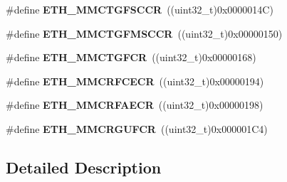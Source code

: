 \begin{DoxyCompactItemize}
\item 
\#define {\bfseries E\+T\+H\+\_\+\+M\+M\+C\+T\+G\+F\+S\+C\+CR}~((uint32\+\_\+t)0x0000014\+C)\hypertarget{group___h_a_l___e_t_h___aliased___defines_ga355a8ef08cc4a431601016a076ae9562}{}\label{group___h_a_l___e_t_h___aliased___defines_ga355a8ef08cc4a431601016a076ae9562}

\item 
\#define {\bfseries E\+T\+H\+\_\+\+M\+M\+C\+T\+G\+F\+M\+S\+C\+CR}~((uint32\+\_\+t)0x00000150)\hypertarget{group___h_a_l___e_t_h___aliased___defines_gad2324378454cb5afc2709afc6849067d}{}\label{group___h_a_l___e_t_h___aliased___defines_gad2324378454cb5afc2709afc6849067d}

\item 
\#define {\bfseries E\+T\+H\+\_\+\+M\+M\+C\+T\+G\+F\+CR}~((uint32\+\_\+t)0x00000168)\hypertarget{group___h_a_l___e_t_h___aliased___defines_ga1de87b7bf29865be1068300dd2946caf}{}\label{group___h_a_l___e_t_h___aliased___defines_ga1de87b7bf29865be1068300dd2946caf}

\item 
\#define {\bfseries E\+T\+H\+\_\+\+M\+M\+C\+R\+F\+C\+E\+CR}~((uint32\+\_\+t)0x00000194)\hypertarget{group___h_a_l___e_t_h___aliased___defines_gacb9b04ab9c5957905a2db7314d6907b8}{}\label{group___h_a_l___e_t_h___aliased___defines_gacb9b04ab9c5957905a2db7314d6907b8}

\item 
\#define {\bfseries E\+T\+H\+\_\+\+M\+M\+C\+R\+F\+A\+E\+CR}~((uint32\+\_\+t)0x00000198)\hypertarget{group___h_a_l___e_t_h___aliased___defines_ga99f6ddc380fffdfe66e6659f7c4ba325}{}\label{group___h_a_l___e_t_h___aliased___defines_ga99f6ddc380fffdfe66e6659f7c4ba325}

\item 
\#define {\bfseries E\+T\+H\+\_\+\+M\+M\+C\+R\+G\+U\+F\+CR}~((uint32\+\_\+t)0x000001\+C4)\hypertarget{group___h_a_l___e_t_h___aliased___defines_gadd605f380a482a06a59498eea4cad15f}{}\label{group___h_a_l___e_t_h___aliased___defines_gadd605f380a482a06a59498eea4cad15f}

\end{DoxyCompactItemize}


\subsection{Detailed Description}
